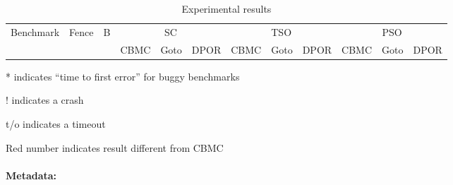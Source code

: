 \documentclass{article}
\begin{document}
\newcommand{\cc}[1]{\multicolumn{1}{c|}{#1}}
\newcommand{\dcc}[1]{\multicolumn{1}{c||}{#1}}

\newcommand{\tools}{\cc{CBMC} & \cc{Goto} & \dcc{DPOR}}

\begin{table}
  \centering
  \begin{tabular}{|l|c|c||r|r|r||r|r|r||r|r|r||}
    \hline
    \multirow{2}{*}{Benchmark} & \multirow{2}{*}{Fence} & \multirow{2}{*}{B} &
    \multicolumn{3}{c||}{SC} & \multicolumn{3}{c||}{TSO} & \multicolumn{3}{c||}{PSO} \\
    \cline{4-12}
    & & & \tools & \tools & \tools \\
    \hline
    \hline
    
  \end{tabular}
  \caption{Experimental results}
\end{table}

* indicates ``time to first error'' for buggy benchmarks

! indicates a crash

t/o indicates a timeout

{\color{red}Red number} indicates result different from CBMC

\paragraph{Metadata:}


\end{document}
